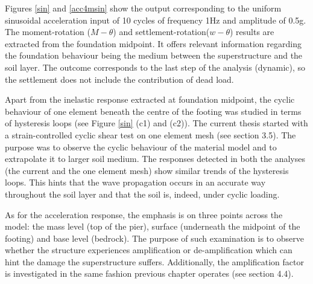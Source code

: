 Figures \ref{sin} and \ref{acc4msin} show the output corresponding to the uniform sinusoidal \mbox{acceleration} input of 10 cycles of frequency 1Hz and amplitude of 0.5g. The moment-rotation ($M-\theta$) and settlement-rotation($w-\theta$) results are extracted from the foundation midpoint. It offers relevant information regarding the foundation behaviour being the medium between the superstructure and the soil layer. The outcome corresponds to the last step of the analysis (dynamic), so the settlement does not include the contribution of dead load.

Apart from the inelastic response extracted at foundation midpoint, the cyclic behaviour of one element beneath the centre of the footing was studied in terms of hysteresis loops (see Figure \ref{sin} (c1) and (c2)). The current thesis started with a strain-controlled cyclic shear test on one element mesh (see section 3.5). The purpose was to observe the cyclic behaviour of the material model and to extrapolate it to larger soil medium. The responses detected in both the analyses (the current and the one element mesh) show similar trends of the hysteresis loops. This hints that the wave propagation occurs in an accurate way throughout the soil layer and that the soil is, indeed, under cyclic loading.

As for the acceleration response, the emphasis is on three points across the model: the mass level (top of the pier), surface (underneath the midpoint of the footing) and base level (bedrock). The purpose of such examination is to observe whether the structure experiences amplification or de-amplification which can hint the damage the superstructure suffers. Additionally, the amplification factor is investigated in the same fashion previous chapter operates (see section 4.4).

